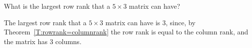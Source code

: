 \documentclass{ximera}
\begin{document}
\begin{exercise} \label{c5.8.2}
What is the largest row rank that a $5\times 3$ matrix can have?

\begin{solution}
The largest row rank that a $5 \times 3$ matrix can have
is $3$, since, by Theorem~\ref{T:rowrank=columnrank} the row rank is
equal to the column rank, and the matrix has $3$ columns.

\end{solution}
\end{exercise}
\end{document}
